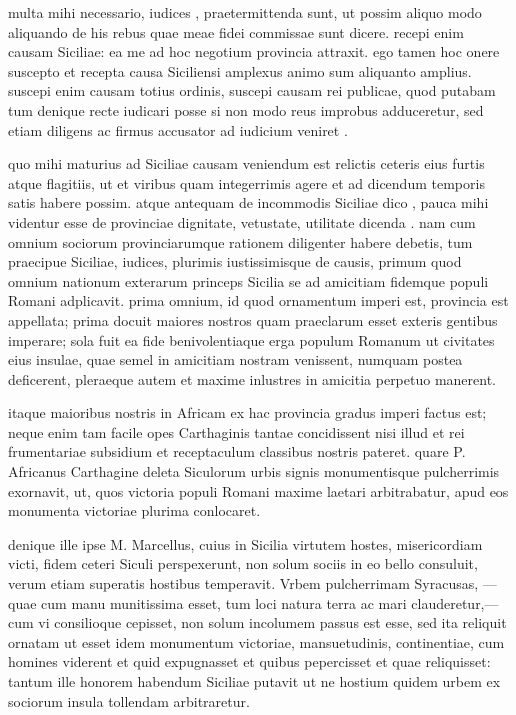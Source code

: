 
 multa mihi necessario, iudices , praetermittenda sunt, ut possim aliquo modo aliquando de his rebus quae meae fidei commissae sunt dicere. recepi enim causam Siciliae: ea me ad hoc negotium provincia attraxit. ego tamen hoc onere suscepto et recepta causa Siciliensi amplexus animo sum aliquanto amplius. suscepi enim causam totius ordinis, suscepi causam rei publicae, quod putabam tum denique recte iudicari posse si non modo reus improbus adduceretur, sed etiam diligens ac firmus accusator ad iudicium veniret .

 quo mihi maturius ad Siciliae causam veniendum est relictis ceteris eius furtis atque flagitiis, ut et viribus quam integerrimis agere et ad dicendum temporis satis habere possim. atque antequam de incommodis Siciliae dico , pauca mihi videntur esse de provinciae dignitate, vetustate, utilitate dicenda . nam cum omnium sociorum provinciarumque rationem diligenter habere debetis, tum praecipue Siciliae, iudices, plurimis iustissimisque de causis, primum quod omnium nationum exterarum princeps Sicilia se ad amicitiam fidemque populi Romani adplicavit. prima omnium, id quod ornamentum imperi est, provincia est appellata; prima docuit maiores nostros quam praeclarum esset exteris gentibus imperare; sola fuit ea fide benivolentiaque erga populum Romanum ut civitates eius insulae, quae semel in amicitiam nostram venissent, numquam postea deficerent, pleraeque autem et maxime inlustres in amicitia perpetuo manerent.

 itaque maioribus nostris in Africam ex hac provincia gradus imperi factus est; neque enim tam facile opes Carthaginis tantae concidissent nisi illud et rei frumentariae subsidium et receptaculum classibus nostris pateret. quare P. Africanus Carthagine deleta Siculorum urbis signis monumentisque pulcherrimis exornavit, ut, quos victoria populi Romani maxime laetari arbitrabatur, apud eos monumenta victoriae plurima conlocaret.

 denique ille ipse M. Marcellus, cuius in Sicilia virtutem hostes, misericordiam victi, fidem ceteri Siculi perspexerunt, non solum sociis in eo bello consuluit, verum etiam superatis hostibus temperavit. Vrbem pulcherrimam Syracusas, —quae cum manu munitissima esset, tum loci natura terra ac mari clauderetur,—cum vi consilioque cepisset, non solum incolumem passus est esse, sed ita reliquit ornatam ut esset idem monumentum victoriae, mansuetudinis, continentiae, cum homines viderent et quid expugnasset et quibus pepercisset et quae reliquisset: tantum ille honorem habendum Siciliae putavit ut ne hostium quidem urbem ex sociorum insula tollendam arbitraretur.

